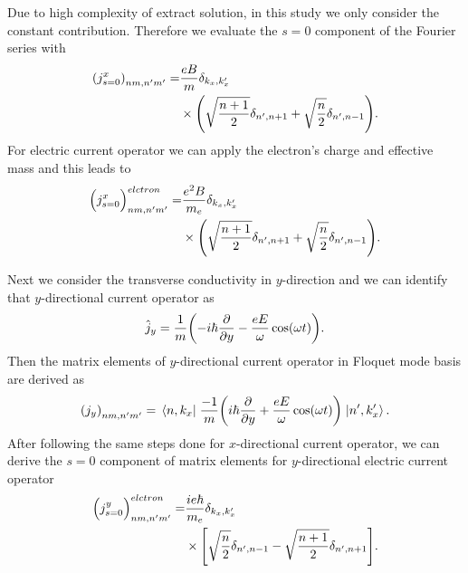 Due to high complexity of extract solution, in this study we only consider the constant contribution. Therefore we evaluate the $s=0$ component of the Fourier series with
\begin{equation} \label{eq_d10}
  \begin{aligned}
      \qty({j}^x_{s=0})_{nm,n'm'} =&
      \frac{eB}{{m}}
      \delta_{k_x,k'_x} \\
      & \times
      \qty(\sqrt{\frac{n+1}{2}} \delta_{n',n+1} + \sqrt{\frac{n}{2}}
      \delta_{n',n-1}).
  \end{aligned}
\end{equation}
For electric current operator we can apply the electron's charge and effective mass and this leads to
\begin{equation} \label{eq_d11}
  \begin{aligned}
      \Big({j}^x_{s=0}\Big)_{nm,n'm'}^{elctron} =&
      \frac{e^2B}{{m_e}}
      \delta_{k_x,k'_x}\\
      & \times
      \qty(\sqrt{\frac{n+1}{2}} \delta_{n',n+1} + \sqrt{\frac{n}{2}}
      \delta_{n',n-1}).
  \end{aligned}
\end{equation}

Next we consider the transverse conductivity in $y$-direction and we can identify that $y$-directional current operator as
\begin{equation} \label{eq_d12}
  \hat{j}_y = \frac{1}{m} \qty(-i\hbar\pdv{y} - \frac{eE}{\omega}\cos(\omega t)).
\end{equation}
Then the matrix elements of $y$-directional current operator in Floquet mode basis are derived as
\begin{equation} \label{eq_d13}
  \qty({j}_y)_{nm,n'm'} =
  \mel{n,k_x}{\;\frac{-1}{m} \qty(i\hbar\pdv{y} + \frac{eE}{\omega}\cos(\omega t))\;}{n',k'_x}.
\end{equation}
After following the same steps done for $x$-directional current operator, we can derive the $s=0$ component of matrix elements for $y$-directional electric current operator
\begin{equation} \label{eq_d14}
  \begin{aligned}
    \Big({j}^y_{s=0}\Big)_{nm,n'm'}^{elctron} = &
    \frac{ie\hbar}{{m_e}}
    \delta_{k_x,k'_x} \\
    & \times
    \qty[
    \sqrt{\frac{n}{2}} \delta_{n',n-1}
    - \sqrt{\frac{n+1}{2}} \delta_{n',n+1}
    ].
  \end{aligned}
\end{equation}
